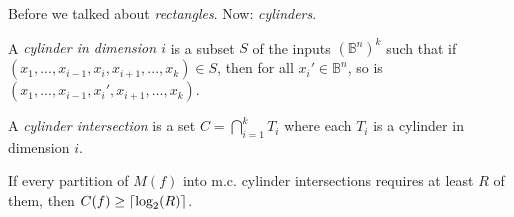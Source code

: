 Before we talked about \emph{rectangles}.
Now: \emph{cylinders}.
\begin{definition}[Cylinder]
A \textit{cylinder in dimension $i$} is a subset $S$ of the inputs $(\mathbb{B}^n)^k$ such that if $(x_1, ..., x_{i - 1}, x_i, x_{i + 1}, ..., x_k) \in S$,
then for all $x_i' \in \mathbb{B}^n$, so is $(x_1, ..., x_{i - 1}, x_i', x_{i + 1}, ..., x_k)$.
\end{definition}
\pause
\begin{definition}
A \emph{cylinder intersection} is a set
\(C = \bigcap_{i = 1}^k T_i\)
where each $T_i$ is a cylinder in dimension $i$.
\end{definition}
\pause
\begin{lemma}
If every partition of $M(f)$ into m.c. cylinder intersections requires at least $R$ of them, then $C(f) \geq \lceil\text{log}_2(R)\rceil$.
\end{lemma}